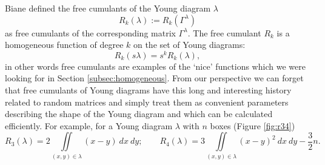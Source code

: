 \documentclass{emsprocart}
\theoremstyle{definition}
\begin{document}
Biane defined the free cumulants of the Young diagram $\lambda$
$$ R_k(\lambda):= R_k(\Gamma^\lambda) $$
as free cumulants of the corresponding matrix $\Gamma^\lambda$. 
The free cumulant $R_k$ is a homogeneous function of degree $k$ on the set of Young diagrams:
$$ R_k(s\lambda) = s^k R_k(\lambda),$$
in other words free cumulants are examples of the `nice' functions which we were looking for in Section \ref{subsec:homogeneous}.
From our perspective we can forget that free cumulants of Young diagrams have this long and interesting
history related to random matrices and simply treat them as convenient parameters describing the shape of the Young diagram and which can be calculated efficiently.
For example, for a Young diagram $\lambda$ with $n$ boxes (Figure \ref{fig:r34})
$$ R_3(\lambda)= 2 \iint\limits_{(x,y)\in\lambda} (x-y) \ dx\ dy; \qquad 
 R_4(\lambda)= 3 \iint\limits_{(x,y)\in\lambda} (x-y)^2 \ dx\ dy -\frac{3}{2} n.$$
\end{document}
